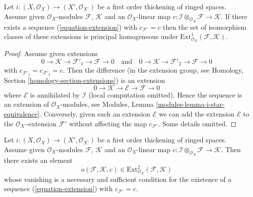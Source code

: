 \begin{lemma}
\label{lemma-inf-ext}
Let $i : (X, \mathcal{O}_X) \to (X', \mathcal{O}_{X'})$ be a first order
thickening of ringed spaces.
Assume given $\mathcal{O}_X$-modules $\mathcal{F}$, $\mathcal{K}$
and an $\mathcal{O}_X$-linear map
$c : \mathcal{I} \otimes_{\mathcal{O}_X} \mathcal{F} \to \mathcal{K}$.
If there exists a sequence (\ref{equation-extension}) with
$c_{\mathcal{F}'} = c$ then the set of isomorphism classes of these
extensions is principal homogeneous under
$\text{Ext}^1_{\mathcal{O}_X}(\mathcal{F}, \mathcal{K})$.
\end{lemma}

\begin{proof}
Assume given extensions
$$
0 \to \mathcal{K} \to \mathcal{F}'_1 \to \mathcal{F} \to 0
\quad\text{and}\quad
0 \to \mathcal{K} \to \mathcal{F}'_2 \to \mathcal{F} \to 0
$$
with $c_{\mathcal{F}'_1} = c_{\mathcal{F}'_2} = c$. Then the difference
(in the extension group, see
Homology, Section \ref{homology-section-extensions})
is an extension
$$
0 \to \mathcal{K} \to \mathcal{E} \to \mathcal{F} \to 0
$$
where $\mathcal{E}$ is annihilated by $\mathcal{I}$ (local computation
omitted). Hence the sequence is an extension of $\mathcal{O}_X$-modules,
see Modules, Lemma \ref{modules-lemma-i-star-equivalence}.
Conversely, given such an extension $\mathcal{E}$ we can add the extension
$\mathcal{E}$ to the $\mathcal{O}_{X'}$-extension $\mathcal{F}'$ without
affecting the map $c_{\mathcal{F}'}$. Some details omitted.
\end{proof}

\begin{lemma}
\label{lemma-inf-obs-ext}
Let $i : (X, \mathcal{O}_X) \to (X', \mathcal{O}_{X'})$
be a first order thickening of ringed spaces. Assume given
$\mathcal{O}_X$-modules $\mathcal{F}$, $\mathcal{K}$
and an $\mathcal{O}_X$-linear map
$c : \mathcal{I} \otimes_{\mathcal{O}_X} \mathcal{F} \to \mathcal{K}$.
Then there exists an element
$$
o(\mathcal{F}, \mathcal{K}, c) \in
\text{Ext}^2_{\mathcal{O}_X}(\mathcal{F}, \mathcal{K})
$$
whose vanishing is a necessary and sufficient condition for the existence
of a sequence (\ref{equation-extension}) with $c_{\mathcal{F}'} = c$.
\end{lemma}

